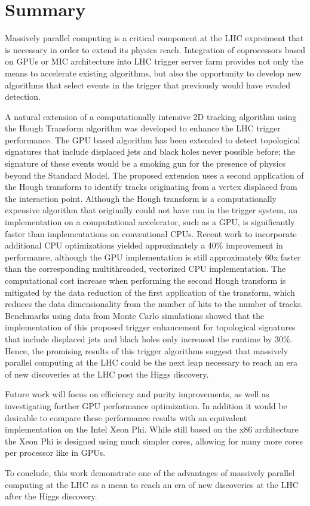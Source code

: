 \documentclass[preprint,sort&compress]{elsarticle}
\begin{document}
\section{Summary}


Massively parallel computing  is a critical component at the LHC expreiment that is  necessary in order to extend its physics reach. 
Integration of coprocessors based on GPUs or MIC architecture into LHC trigger server farm provides not 
only the means to accelerate existing algorithms, but also the opportunity to develop new algorithms that select events
 in the trigger that previously would have evaded detection.

A natural extension of a computationally intensive 2D tracking algorithm using the Hough Transform algorithm was developed to enhance the LHC trigger performance.
The GPU based algorithm has been extended to detect topological signatures that include displaced jets and black holes never possible before; 
the signature of these events would be a smoking gun for the presence of physics beyond the Standard Model. 
The proposed extension uses a second application of the Hough transform to identify tracks originating from a vertex displaced from the interaction point. 
 Although the Hough transform is a computationally expensive algorithm that originally could not have run in the trigger system, an implementation on a computational accelerator, such as a GPU, 
is significantly faster than implementations on conventional CPUs.  Recent work to incorporate additional CPU optimizations yielded approximately a 40\% improvement in performance, 
although the GPU implementation is still approximately 60x faster than the corresponding multithreaded, vectorized CPU implementation.  The computational cost increase when performing the second
 Hough transform is mitigated by the data reduction of the first application of the transform, which reduces the data dimensionality from the number of hits to the number of tracks. 
 Benchmarks using data from Monte Carlo simulations showed that the implementation of this proposed trigger enhancement for topological signatures that include 
displaced jets and black holes only increased the runtime by 30\%. Hence, the promising results of this trigger algorithms suggest that massively parallel computing at the LHC could be the next leap necessary 
to reach an era of new discoveries at the LHC post the Higgs discovery. 

Future work will focus on efficiency and purity improvements, as well as investigating further GPU performance optimization.  In addition it would be desirable to compare these performance results with an equivalent implementation on the Intel Xeon Phi.  While still based on the x86 architecture the Xeon Phi is designed using much simpler cores, allowing for many more cores per processor like in GPUs.

To conclude, this work demonstrate one of the advantages of massively parallel computing at the LHC as a mean to reach an era of new discoveries at
the LHC after the Higgs discovery.




\end{document}
